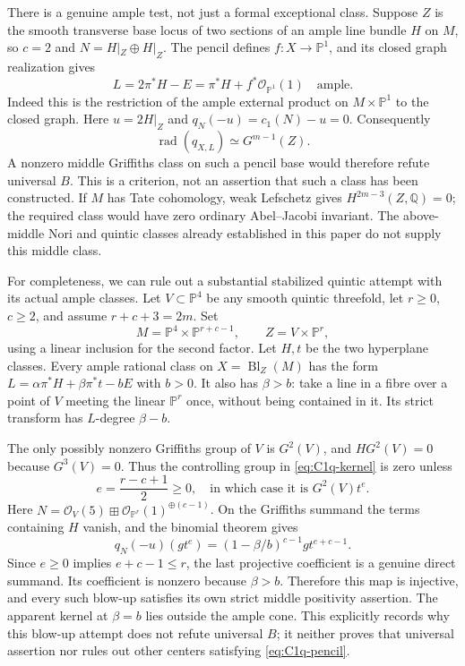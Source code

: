 There is a genuine ample test, not just a formal exceptional
class. Suppose $Z$ is the smooth transverse base locus of two
sections of an ample line bundle $H$ on $M$, so $c=2$ and
$N=H|_Z\oplus H|_Z$. The pencil defines $f:X\to\mathbb P^1$,
and its closed graph realization gives
\[
 L=2\pi^*H-E=\pi^*H+f^*\mathcal O_{\mathbb P^1}(1)
                         \quad\text{ample}.
\]
Indeed this is the restriction of the ample external product
on $M\times\mathbb P^1$ to the closed graph. Here $u=2H|_Z$
and $q_N(-u)=c_1(N)-u=0$. Consequently
\begin{equation}\label{eq:C1q-pencil}
       \operatorname{rad}(q_{X,L})\simeq G^{m-1}(Z).
\end{equation}
A nonzero middle Griffiths class on such a pencil base would
therefore refute universal $B$. This is a criterion, not an
assertion that such a class has been constructed. If $M$ has
Tate cohomology, weak Lefschetz gives
$H^{2m-3}(Z,\mathbb Q)=0$; the required class would have zero
ordinary Abel--Jacobi invariant. The above-middle Nori and
quintic classes already established in this paper do not
supply this middle class.

For completeness, we can rule out a substantial stabilized
quintic attempt with its actual ample classes. Let $V\subset
\mathbb P^4$ be any smooth quintic threefold, let $r\ge0$,
$c\ge2$, and assume $r+c+3=2m$. Set
\[
 M=\mathbb P^4\times\mathbb P^{r+c-1},\qquad
 Z=V\times\mathbb P^r,
\]
using a linear inclusion for the second factor. Let $H,t$
be the two hyperplane classes. Every ample rational class on
$X=\operatorname{Bl}_Z(M)$ has the form
$L=\alpha\pi^*H+\beta\pi^*t-bE$ with $b>0$.
It also has $\beta>b$: take a line in a fibre over a point
of $V$ meeting the linear $\mathbb P^r$ once, without being
contained in it. Its strict transform has $L$-degree $\beta-b$.

The only possibly nonzero Griffiths group of $V$ is $G^2(V)$,
and $H G^2(V)=0$ because $G^3(V)=0$. Thus the controlling
group in \eqref{eq:C1q-kernel} is zero unless
\[
 e=\frac{r-c+1}{2}\ge0,
 \quad\text{in which case it is }G^2(V)t^e.
\]
Here
$N=\mathcal O_V(5)\boxplus
\mathcal O_{\mathbb P^r}(1)^{\oplus(c-1)}$.
On the Griffiths summand the terms containing $H$ vanish,
and the binomial theorem gives
\[
 q_N(-u)(g t^e)
      =(1-\beta/b)^{c-1}g t^{e+c-1}.
\]
Since $e\ge0$ implies $e+c-1\le r$, the last projective
coefficient is a genuine direct summand. Its coefficient
is nonzero because $\beta>b$. Therefore this map is
injective, and every such blow-up satisfies its own strict
middle positivity assertion. The apparent kernel at
$\beta=b$ lies outside the ample cone. This explicitly
records why this blow-up attempt does not refute universal
$B$; it neither proves that universal assertion nor rules
out other centers satisfying \eqref{eq:C1q-pencil}.
